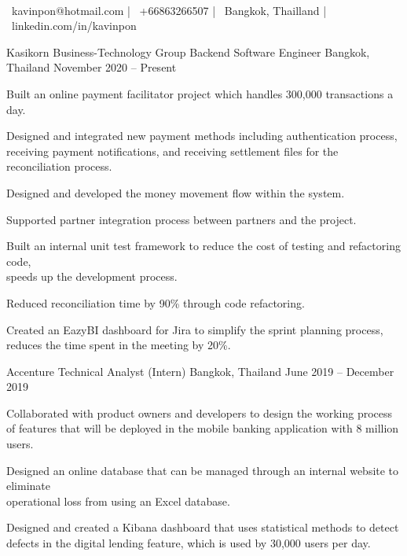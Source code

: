 \documentclass[]{awesome-cv}
\begin{document}
\begin{center}
	  \\
	\vspace{2mm}
	{\faEnvelope\ kavinpon@hotmail.com} | {\faMobile\ +66863266507} | {\faMapMarker\ Bangkok, Thailland} | {\faLinkedin\ linkedin.com/in/kavinpon}
\end{center}
\begin{cventries}
	\cventry
	{Kasikorn Business-Technology Group}
	{Backend Software Engineer}
	{Bangkok, Thailand}
	{November 2020 – Present}
	{\begin{cvitems}
			\item {Built an online payment facilitator project which handles 300,000 transactions a day.}
			\item {Designed and integrated new payment methods including authentication process,\\ receiving payment notifications, and receiving settlement files for the reconciliation process.}
			\item {Designed and developed the money movement flow within the system.}
			\item {Supported partner integration process between partners and the project.}
			\item {Built an internal unit test framework to reduce the cost of testing and refactoring code,\\ speeds up the development process.}
			\item {Reduced reconciliation time by 90\% through code refactoring.}
			\item {Created an EazyBI dashboard for Jira to simplify the sprint planning process,\\ reduces the time spent in the meeting by 20\%.}
		\end{cvitems}}
	\cventry
	{Accenture}
	{Technical Analyst (Intern)}
	{Bangkok, Thailand}
	{June 2019 – December 2019}
	{\begin{cvitems}
			\item {Collaborated with product owners and developers to design the working process\\ of features that will be deployed in the mobile banking application with 8 million users.}
			\item {Designed an online database that can be managed through an internal website to eliminate\\ operational loss from using an Excel database.}
			\item {Designed and created a Kibana dashboard that uses statistical methods to detect\\ defects in the digital lending feature, which is used by 30,000 users per day.}
		\end{cvitems}}
\end{cventries}
\end{document}

